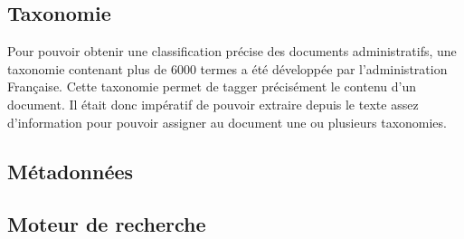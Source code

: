
\subsection{Taxonomie}
Pour pouvoir obtenir une classification précise des documents administratifs, une taxonomie contenant plus de 6000 termes a été développée par l'administration Française. Cette taxonomie permet de tagger précisément le contenu d'un document.
Il était donc impératif de pouvoir extraire depuis le texte assez d'information pour pouvoir assigner au document une ou plusieurs taxonomies.

\subsection{Métadonnées}

\subsection{Moteur de recherche}
